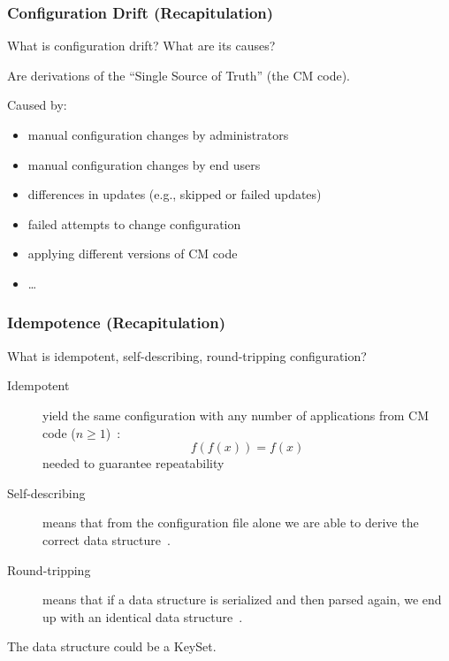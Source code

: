 \begin{frame}
	\frametitle{Configuration Drift (Recapitulation)}

	\begin{task}
	What is configuration drift? What are its causes?
	\end{task}

	\pause

	Are derivations of the ``Single Source of Truth'' (the CM code).

	Caused by:

	\begin{itemize} %
	\item manual configuration changes by administrators
	\item manual configuration changes by end users
	\item differences in updates (e.g., skipped or failed updates)
	\item failed attempts to change configuration
	\item applying different versions of CM code
	\item \dots
	\end{itemize}


\end{frame}

\begin{frame}
	\frametitle{Idempotence (Recapitulation)}

	\begin{task}
	What is idempotent, self-describing, round-tripping configuration?
	\end{task}

	\pause


	\begin{description}
	\item[Idempotent]
	yield the same configuration with any number of applications from CM code ($n\ge1$)~\cite{waldemar2013testing}:
	\[
		f(f(x))=f(x)
	\]
	needed to guarantee repeatability

	\item[Self-describing]
	means that from the configuration file alone we are able to derive the correct data structure~\cite{wadler2003xml}.

	\item[Round-tripping]
	means that if a data structure is serialized and then parsed again, we end up with an identical data structure~\cite{wadler2003xml}.
	\end{description}

	The data structure could be a KeySet.
\end{frame}

